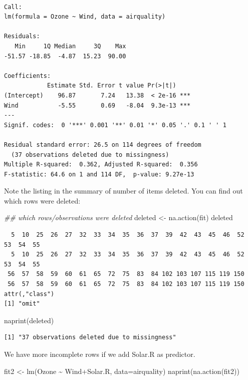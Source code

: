 \documentclass[
  letterpaper,
  DIV=11,
  numbers=noendperiod]{scrreprt}
\newenvironment{Shaded}{\begin{snugshade}}{\end{snugshade}}
\newcommand{\AttributeTok}[1]{\textcolor[rgb]{0.49,0.56,0.16}{#1}}
\newcommand{\DocumentationTok}[1]{\textcolor[rgb]{0.73,0.13,0.13}{\textit{#1}}}
\newcommand{\FunctionTok}[1]{\textcolor[rgb]{0.02,0.16,0.49}{#1}}
\newcommand{\NormalTok}[1]{\textcolor[rgb]{0.00,0.44,0.13}{#1}}
\newcommand{\OtherTok}[1]{\textcolor[rgb]{0.00,0.44,0.13}{#1}}
\newcommand{\SpecialCharTok}[1]{\textcolor[rgb]{0.25,0.44,0.63}{#1}}
\begin{document}
\begin{verbatim}

Call:
lm(formula = Ozone ~ Wind, data = airquality)

Residuals:
   Min     1Q Median     3Q    Max 
-51.57 -18.85  -4.87  15.23  90.00 

Coefficients:
            Estimate Std. Error t value Pr(>|t|)    
(Intercept)    96.87       7.24   13.38  < 2e-16 ***
Wind           -5.55       0.69   -8.04  9.3e-13 ***
---
Signif. codes:  0 '***' 0.001 '**' 0.01 '*' 0.05 '.' 0.1 ' ' 1

Residual standard error: 26.5 on 114 degrees of freedom
  (37 observations deleted due to missingness)
Multiple R-squared:  0.362, Adjusted R-squared:  0.356 
F-statistic: 64.6 on 1 and 114 DF,  p-value: 9.27e-13
\end{verbatim}

Note the listing in the summary of number of items deleted. You can find
out which rows were deleted:

\begin{Shaded}
\begin{Highlighting}[]
\DocumentationTok{\#\# which rows/observations were deleted}
\NormalTok{  deleted }\OtherTok{\textless{}{-}} \FunctionTok{na.action}\NormalTok{(fit)}
\NormalTok{  deleted}
\end{Highlighting}
\end{Shaded}

\begin{verbatim}
  5  10  25  26  27  32  33  34  35  36  37  39  42  43  45  46  52  53  54  55 
  5  10  25  26  27  32  33  34  35  36  37  39  42  43  45  46  52  53  54  55 
 56  57  58  59  60  61  65  72  75  83  84 102 103 107 115 119 150 
 56  57  58  59  60  61  65  72  75  83  84 102 103 107 115 119 150 
attr(,"class")
[1] "omit"
\end{verbatim}

\begin{Shaded}
\begin{Highlighting}[]
  \FunctionTok{naprint}\NormalTok{(deleted)}
\end{Highlighting}
\end{Shaded}

\begin{verbatim}
[1] "37 observations deleted due to missingness"
\end{verbatim}

We have more incomplete rows if we add Solar.R as predictor.

\begin{Shaded}
\begin{Highlighting}[]
\NormalTok{  fit2 }\OtherTok{\textless{}{-}} \FunctionTok{lm}\NormalTok{(Ozone }\SpecialCharTok{\textasciitilde{}}\NormalTok{ Wind}\SpecialCharTok{+}\NormalTok{Solar.R, }\AttributeTok{data=}\NormalTok{airquality)}
  \FunctionTok{naprint}\NormalTok{(}\FunctionTok{na.action}\NormalTok{(fit2))}
\end{Highlighting}
\end{Shaded}
\end{document}
